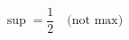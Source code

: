 \documentclass[preview]{standalone}
\begin{document}
\begin{align*}
\sup = \dfrac{1}{2} \quad \text{(not max)}
\end{align*}
\end{document}

